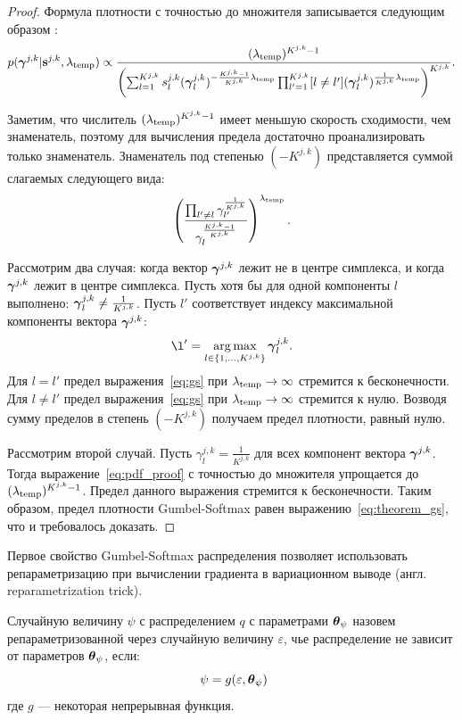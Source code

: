 \begin{proof} 
Формула плотности с точностью до множителя записывается следующим образом :
\begin{equation}
\label{eq:pdf_proof}
    p(\boldsymbol{\gamma}^{j,k}|\mathbf{s}^{j,k}, \lambda_{\text{temp}}) \propto    \frac{(\lambda_{\text{temp}})^{K^{j,k}-1}}{\left(\sum_{l=1}^{K^{j,k}} s^{j,k}_l(\boldsymbol{\gamma}^{j,k}_l)^{-\frac{K^{j,k}-1}{K^{j,k}}\lambda_{\text{temp}}}\prod_{l'=1}^{K^{j,k}} [l \neq l'](\boldsymbol{\gamma}_l^{j,k})^{\frac{1}{K^{j,k}}\lambda_{\text{temp}}}\right)^{K^{j,k}}}.
\end{equation}

Заметим, что числитель $(\lambda_{\text{temp}})^{K^{j,k}-1}$ имеет меньшую скорость сходимости, чем знаменатель, поэтому для вычисления предела достаточно проанализировать только знаменатель. Знаменатель под степенью $(-K^{j,k})$ представляется суммой слагаемых следующего вида: 
\begin{equation}
\label{eq:gs}
    \left(\frac{\prod_{l' \neq l} \gamma_{l'}^{\frac{1}{K^{j,k}}}}{\gamma_l^{\frac{K^{j,k}-1}{K^{j,k}}}}\right)^{\lambda_{\text{temp}}}.
\end{equation}

Рассмотрим два случая: когда вектор $\boldsymbol{\gamma}^{j,k}$  лежит не в центре симплекса, и когда  $\boldsymbol{\gamma}^{j,k}$ лежит в центре симплекса. 
Пусть хотя бы для одной компоненты $l$ выполнено: $\boldsymbol{\gamma}^{j,k}_l \neq \frac{1}{K^{j,k}}$. Пусть $l'$ соответствует индексу максимальной компоненты вектора $\boldsymbol{\gamma}^{j,k}$:
\[
    \l' = \argmax_{l \in \{1,\dots,K^{j,k}\}} \g^{j,k}_l.
\]
Для $l=l'$ предел выражения~\eqref{eq:gs} при $\lambda_{\text{temp}} \to \infty$ стремится к бесконечности. Для $l\neq l'$ предел выражения~\eqref{eq:gs} при $\lambda_{\text{temp}} \to \infty$ стремится к нулю. Возводя сумму пределов в степень $(-K^{j,k})$ получаем предел плотности, равный нулю.

Рассмотрим второй случай. Пусть ${\gamma}^{j,k}_l = \frac{1}{K^{j,k}}$ для всех компонент вектора $\boldsymbol{\gamma}^{j,k}$.
Тогда выражение~\eqref{eq:pdf_proof} с точностью до множителя упрощается до $(\lambda_{\text{temp}})^{K^{j,k}-1}$. Предел данного выражения стремится к бесконечности.
Таким образом, предел плотности Gumbel-Softmax равен выражению~\eqref{eq:theorem_gs}, что и требовалось доказать.

\end{proof}


Первое свойство Gumbel-Softmax распределения позволяет использовать репараметризацию при вычислении градиента в вариационном выводе (англ. reparametrization trick). 
\begin{defin} Случайную величину  $\psi$ с распределением $q$ с параметрами $\boldsymbol{\theta}_\psi$ назовем репараметризованной через случайную величину $\varepsilon$, чье распределение не зависит от параметров $\boldsymbol{\theta}_\psi$, если:
\[
   \psi = g(\varepsilon, \teta_\psi)
\]
где  $g$ --- некоторая непрерывная функция.
\end{defin}

